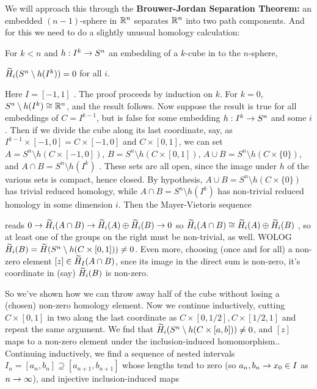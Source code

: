 \msk

We will approach this through the {\bf Brouwer-Jordan Separation Theorem:} an embedded $(n-1)$-sphere
in ${\Bbb R}^n$ separates ${\Bbb R}^n$ into two path components. And for this we need to do a slightly
unusual homology calculation:

\ssk

For $k<n$ and $h:I^k\rightarrow S^n$ an embedding of a $k$-cube in to the $n$-sphere,

$\widetilde{H}_i(S^n\setminus h(I^k))=0$ for all $i$.

\ssk 

Here $I=[-1,1]$ . The proof proceeds by induction on $k$. For $k=0$, $S^n\setminus h(I^k)\cong {\Bbb R}^n$,
and the result follows. Now suppose the result is true for all embeddings of $C=I^{k-1}$,
but is false for some embedding $h:I^k\rightarrow S^n$ and some $i$. Then if we divide the cube along its last coordinate, say,
as $I^{k-1}\times [-1,0] = C\times [-1,0]$ and $C\times [0,1]$, we can set
$A=S^n\setminus h(C\times [-1,0])$, $B = S^n\setminus h(C\times [0,1])$, 
$A\cup B = S^n\setminus h(C\times \{0\})$, and $A\cap B = S^n\setminus h(I^k)$ .
These sets are all open, since the image under $h$ of the various sets is compact, hence closed.
By hypothesis, $A\cup B = S^n\setminus h(C\times \{0\})$ has trivial reduced homology, while
$A\cap B = S^n\setminus h(I^k)$ has non-trivial reduced homology in some dimension $i$. Then 
the Mayer-Vietoris sequence

\ssk


\ssk  reads $0\rightarrow \widetilde{H}_i(A\cap B) \rightarrow \widetilde{H}_i(A)\oplus \widetilde{H}_i(B) \rightarrow 0$ so 
$\widetilde{H}_i(A\cap B) \cong \widetilde{H}_i(A)\oplus \widetilde{H}_i(B)$ , so at least one of the groups
on the right must be non-trivial, as well. WOLOG $\widetilde{H}_i(B)=\widetilde{H}(S^n\setminus h(C\times [0,1]))\neq 0$.
Even more, choosing (once and for all) a non-zero element $[z]\in \widetilde{H}_I(A\cap B)$, snce its image in the
direct sum is non-zero, it's coordinate in (say) $\widetilde{H}_i(B)$ is non-zero.

\bsk

So we've shown how we can throw away half of the cube without losing a (chosen)
non-zero homology element.
Now we continue inductively, cutting $C\times [0,1]$ in two along the last coordinate as
$C\times [0,1/2],C\times [1/2,1]$ and repeat the same argument. We fnd that
$\widetilde{H}_i(S^n\setminus h(C\times [a,b]))\neq 0$, and $[z]$ maps to a non-zero 
element under the inclusion-induced homomorphism.. Continuing inductively, we find a
sequence of nested intervals $I_n=[a_n,b_n]\supseteq [a_{n+1},b_{n+1}]$ 
whose lengths tend to zero (so $a_n,b_n\rightarrow x_0\in I$ as $n\rightarrow\infty$), and injective inclusion-induced maps

